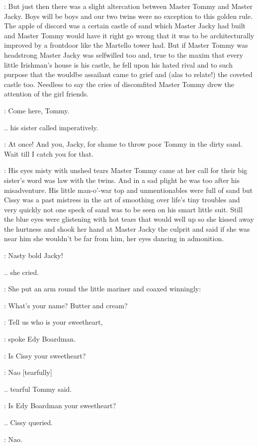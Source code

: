 :
But just then there was a slight altercation between Master Tommy
and Master Jacky. Boys will be boys and our two twins were no exception
to this golden rule. The apple of discord was a certain castle of sand
which Master Jacky had built and Master Tommy would have it right go wrong
that it was to be architecturally improved by a frontdoor like the
Martello tower had. But if Master Tommy was headstrong Master Jacky was
selfwilled too and, true to the maxim that every little Irishman's house
is his castle, he fell upon his hated rival and to such purpose that the
wouldbe assailant came to grief and (alas to relate!) the coveted castle
too. Needless to say the cries of discomfited Master Tommy drew the
attention of the girl friends.

\cissy:
Come here, Tommy.

.. his sister called imperatively.

\cissy:
At once! And you,
Jacky, for shame to throw poor Tommy in the dirty sand. Wait till I catch
you for that.

:
His eyes misty with unshed tears Master Tommy came at her call for
their big sister's word was law with the twins. And in a sad plight he was
too after his misadventure. His little man-o'-war top and unmentionables
were full of sand but Cissy was a past mistress in the art of smoothing
over life's tiny troubles and very quickly not one speck of sand was
to be seen on his smart little suit. Still the blue eyes were glistening
with hot tears that would well up so she kissed away the hurtness and
shook her hand at Master Jacky the culprit and said if she was near
him she wouldn't be far from him, her eyes dancing in admonition.

\cissy:
Nasty bold Jacky!

.. she cried.

:
She put an arm round the little mariner and coaxed winningly:

\cissy:
What's your name? Butter and cream?

\edy:
Tell us who is your sweetheart,

:
spoke Edy Boardman.

\edy:
Is Cissy your sweetheart?

\tommy:
Nao [tearfully]

.. tearful Tommy said.

\cissy:
Is Edy Boardman your sweetheart?

.. Cissy queried.

\tommy:
Nao.

